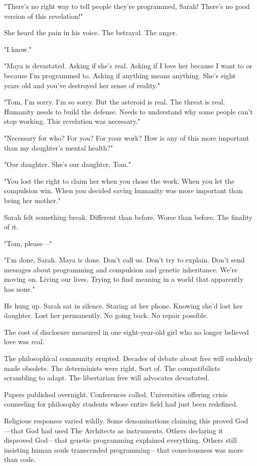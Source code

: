 "There's no right way to tell people they're programmed, Sarah! There's no good version of this revelation!"

She heard the pain in his voice. The betrayal. The anger.

"I know."

"Maya is devastated. Asking if she's real. Asking if I love her because I want to or because I'm programmed to. Asking if anything means anything. She's eight years old and you've destroyed her sense of reality."

"Tom, I'm sorry. I'm so sorry. But the asteroid is real. The threat is real. Humanity needs to build the defense. Needs to understand why some people can't stop working. This revelation was necessary."

"Necessary for who? For you? For your work? How is any of this more important than my daughter's mental health?"

"Our daughter. She's our daughter, Tom."

"You lost the right to claim her when you chose the work. When you let the compulsion win. When you decided saving humanity was more important than being her mother."

Sarah felt something break. Different than before. Worse than before. The finality of it.

"Tom, please—"

"I'm done, Sarah. Maya is done. Don't call us. Don't try to explain. Don't send messages about programming and compulsion and genetic inheritance. We're moving on. Living our lives. Trying to find meaning in a world that apparently has none."

He hung up. Sarah sat in silence. Staring at her phone. Knowing she'd lost her daughter. Lost her permanently. No going back. No repair possible.

The cost of disclosure measured in one eight-year-old girl who no longer believed love was real.

\scenebreak

The philosophical community erupted. Decades of debate about free will suddenly made obsolete. The determinists were right. Sort of. The compatibilists scrambling to adapt. The libertarian free will advocates devastated.

Papers published overnight. Conferences called. Universities offering crisis counseling for philosophy students whose entire field had just been redefined.

Religious responses varied wildly. Some denominations claiming this proved God—that God had used The Architects as instruments. Others declaring it disproved God—that genetic programming explained everything. Others still insisting human souls transcended programming—that consciousness was more than code.

